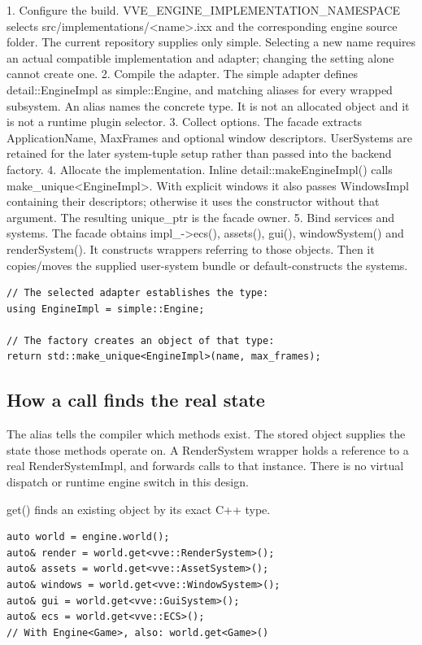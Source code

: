 \documentclass[11pt,a4paper]{article}
\begin{document}
1. Configure the build. VVE\_ENGINE\_IMPLEMENTATION\_NAMESPACE selects src/implementations/<name>.ixx and the corresponding engine source folder. The current repository supplies only simple. Selecting a new name requires an actual compatible implementation and adapter; changing the setting alone cannot create one. 2. Compile the adapter. The simple adapter defines detail::EngineImpl as simple::Engine, and matching aliases for every wrapped subsystem. An alias names the concrete type. It is not an allocated object and it is not a runtime plugin selector. 3. Collect options. The facade extracts ApplicationName, MaxFrames and optional window descriptors. UserSystems are retained for the later system-tuple setup rather than passed into the backend factory. 4. Allocate the implementation. Inline detail::makeEngineImpl() calls make\_unique<EngineImpl>. With explicit windows it also passes WindowsImpl containing their descriptors; otherwise it uses the constructor without that argument. The resulting unique\_ptr is the facade owner. 5. Bind services and systems. The facade obtains impl\_->ecs(), assets(), gui(), windowSystem() and renderSystem(). It constructs wrappers referring to those objects. Then it copies/moves the supplied user-system bundle or default-constructs the systems.

\begin{lstlisting}[language={}]
// The selected adapter establishes the type:
using EngineImpl = simple::Engine;

// The factory creates an object of that type:
return std::make_unique<EngineImpl>(name, max_frames);
\end{lstlisting}

\subsection*{How a call finds the real state}
The alias tells the compiler which methods exist. The stored object supplies the state those methods operate on. A RenderSystem wrapper holds a reference to a real RenderSystemImpl, and forwards calls to that instance. There is no virtual dispatch or runtime engine switch in this design.

\label{core-9}
get() finds an existing object by its exact C++ type.

\begin{lstlisting}[language={}]
auto world = engine.world();
auto& render = world.get<vve::RenderSystem>();
auto& assets = world.get<vve::AssetSystem>();
auto& windows = world.get<vve::WindowSystem>();
auto& gui = world.get<vve::GuiSystem>();
auto& ecs = world.get<vve::ECS>();
// With Engine<Game>, also: world.get<Game>()
\end{lstlisting}
\end{document}

